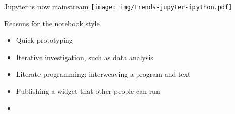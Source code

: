\documentclass[aspectratio=169]{beamer}
\begin{document}
\begin{frame}{Jupyter is now mainstream}
\vspace{0.5 cm}
\texttt{[image: img/trends-jupyter-ipython.pdf]}
\end{frame}

\begin{frame}{Reasons for the notebook style}
\Large
\begin{itemize}\setlength{\itemsep}{0.5 cm}
\item Quick prototyping
\item Iterative investigation, such as data analysis
\item Literate programming: interweaving a program and text
\item Publishing a widget that other people can run
\item {}
\end{itemize}

\hfill {}

\vspace{-0.2 cm}
\hfill {}
\end{frame}
\end{document}
